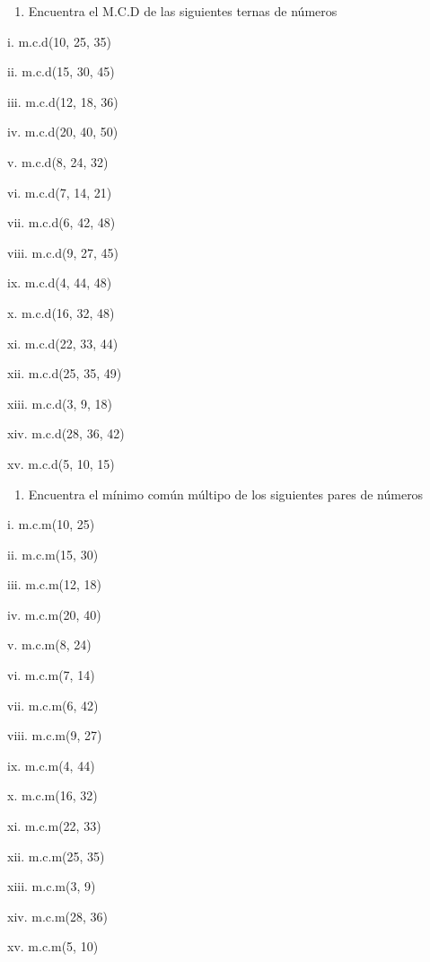 \documentclass[]{book}
\providecommand{\tightlist}{%
  \setlength{\itemsep}{0pt}\setlength{\parskip}{0pt}}
\begin{document}
\begin{enumerate}
\def\labelenumi{\arabic{enumi}.}
\setcounter{enumi}{1}
\tightlist
\item
  Encuentra el M.C.D de las siguientes ternas de números
\end{enumerate}

\begin{multicols}{2}
  
    i. m.c.d(10, 25, 35)
  
    ii. m.c.d(15, 30, 45)
  
    iii. m.c.d(12, 18, 36)
  
    iv. m.c.d(20, 40, 50)
  
    v. m.c.d(8, 24, 32)
  
    vi. m.c.d(7, 14, 21)
  
    vii. m.c.d(6, 42, 48)
  
    viii. m.c.d(9, 27, 45)
  
    ix. m.c.d(4, 44, 48)
  
    x. m.c.d(16, 32, 48)
  
    xi. m.c.d(22, 33, 44)
  
    xii. m.c.d(25, 35, 49)
  
    xiii. m.c.d(3, 9, 18)
  
    xiv. m.c.d(28, 36, 42)
  
    xv. m.c.d(5, 10, 15)
\end{multicols}

\begin{enumerate}
\def\labelenumi{\arabic{enumi}.}
\setcounter{enumi}{2}
\tightlist
\item
  Encuentra el mínimo común múltipo de los siguientes pares de números
\end{enumerate}

\begin{multicols}{2}
  
    i. m.c.m(10, 25)
  
    ii. m.c.m(15, 30)
  
    iii. m.c.m(12, 18)
  
    iv. m.c.m(20, 40)
  
    v. m.c.m(8, 24)
  
    vi. m.c.m(7, 14)
  
    vii. m.c.m(6, 42)
  
    viii. m.c.m(9, 27)
  
    ix. m.c.m(4, 44)
  
    x. m.c.m(16, 32)
  
    xi. m.c.m(22, 33)
  
    xii. m.c.m(25, 35)
  
    xiii. m.c.m(3, 9)
  
    xiv. m.c.m(28, 36)
  
    xv. m.c.m(5, 10)
\end{multicols}
\end{document}
